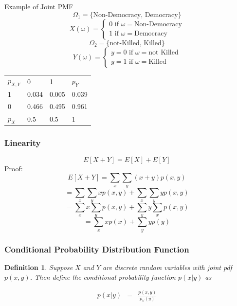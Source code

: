 \documentclass[handout]{beamer}
\newtheorem{defn}{Definition}
\numberwithin{equation}{section}
\begin{document}
\begin{frame}{Example of Joint PMF}
$$\Omega_1=\{\text{Non-Democracy, \ \ Democracy}\}$$
$$X(\omega)=\begin{cases}
 0\text{ if $\omega=$Non-Democracy}\\
1\text{ if $\omega=$Democracy}
\end{cases}$$
\pause
$$\Omega_2=\{\text{not-Killed, \ \ Killed}\}$$
$$Y(\omega)=\begin{cases}
y= 0\text{ if $\omega=$not Killed}\\
y=1\text{ if $\omega=$Killed}
\end{cases}$$

\pause
\begin{table}
\begin{tabular}{lll|l}
		$p_{X,Y}$& 0& 1&$p_{Y}$\\
1 & 0.034& 0.005& 0.039\\
0 & 0.466 &0.495&  0.961\\
\hline
$p_{X}$& 0.5 &0.5&  1
\end{tabular}
\end{table}
\end{frame}


\begin{frame}
\frametitle{Linearity}
$$E[X+Y]=E[X]+E[Y]$$
Proof:
$$E[X+Y] = \sum_{x} \sum_{y} (x+y) p(x, y) $$  \pause 
$$=  \sum_{x} \sum_{y} x p(x, y )+ \sum_{x} \sum_{y} y p(x, y) $$  \pause 
$$=  \sum_{x} x \sum_{y} p(x, y )+  \sum_{y} y \sum_{x} p(x, y) $$  \pause 
$$=  \sum_{x} x p(x )+  \sum_{y} y p( y) $$  \pause 

\end{frame}



\begin{frame}
\frametitle{Conditional Probability Distribution Function}


\begin{defn}
Suppose $X$ and $Y$ are discrete random variables with joint pdf $p(x,y)$.  Then define the \alert{conditional probability function} $p(x|y)$ as 

\begin{eqnarray}
p(x|y) & = & \frac{p(x, y) }{p_{Y}(y) } \nonumber 
\end{eqnarray}

\end{defn}

\end{frame}
\end{document}
